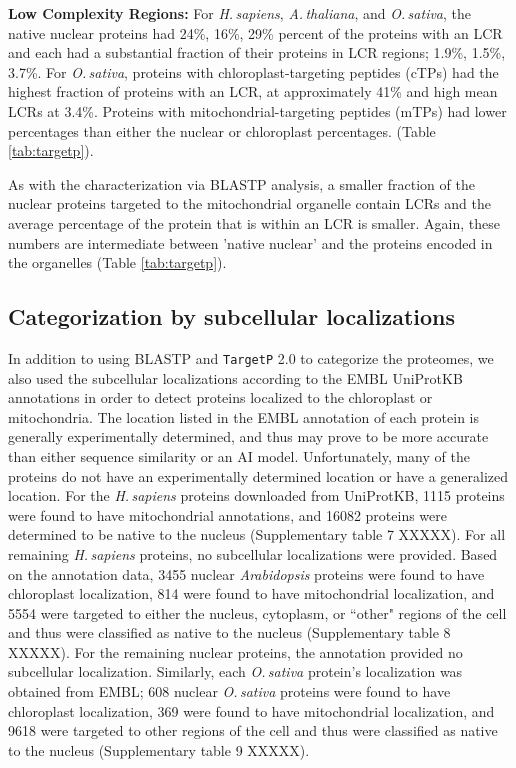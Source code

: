 \documentclass[a4paper,12pt]{article}
\newcommand{\ath}{\mbox{\textit{A.\,thaliana}}\xspace}
\newcommand{\osa}{\mbox{\textit{O.\,sativa}}\xspace}
\newcommand{\hsa}{\mbox{\textit{H.\,sapiens}}\xspace}
\newcommand{\tget}{\mbox{\texttt{TargetP}}\xspace}
\newcommand{\missing}{{\color{red}XXXXX}\xspace}
\newcommand{\humanNucNumberGenbnk}{16082\xspace}
\newcommand{\humanNucMitoNoGenbnk}{1115\xspace}
\newcommand{\arabNucNumberGenbnk}{5554\xspace}
\newcommand{\arabNucMitoNoGenbnk}{814\xspace}
\newcommand{\arabNucChloNoGenbnk}{3455\xspace}
\newcommand{\oryzNucNumberGenbnk}{9618\xspace}
\newcommand{\oryzNucMitoNoGenbnk}{369\xspace}
\newcommand{\oryzNucChloNoGenbnk}{608\xspace}
\begin{document}
\begin{multicols}{2}
\textbf{Low Complexity Regions:}
For \hsa, \ath, and \osa, the native nuclear proteins had 24\%, 16\%, 29\%
percent of the proteins with an LCR and each had a substantial fraction of
their proteins in LCR regions; 1.9\%, 1.5\%, 3.7\%.  For \osa, proteins
with chloroplast-targeting peptides (cTPs) had the highest fraction
of proteins with an LCR, at approximately 41\% and high mean LCRs at
3.4\%. Proteins with mitochondrial-targeting peptides (mTPs) had lower
percentages than either the nuclear or chloroplast percentages. (Table
\ref{tab:targetp}).

As with the characterization via BLASTP analysis, a smaller fraction
of the nuclear proteins targeted to the mitochondrial organelle contain
LCRs and the average percentage of the protein that is within an LCR is
smaller.  Again, these numbers are intermediate between 'native nuclear'
and the proteins encoded in the organelles (Table \ref{tab:targetp}).

 
\subsection*{Categorization by subcellular localizations}

In addition to using BLASTP and \tget 2.0 to categorize the proteomes, we
also used the subcellular localizations according to the EMBL UniProtKB
annotations in order to detect proteins localized to the chloroplast or
mitochondria.  The location listed in the EMBL annotation of each protein
is generally experimentally determined, and thus may prove to be more
accurate than either sequence similarity or an AI model. Unfortunately,
many of the proteins do not have an experimentally determined location
or have a generalized location. For the \hsa proteins downloaded from
UniProtKB, \humanNucMitoNoGenbnk proteins were found to have mitochondrial
annotations, and \humanNucNumberGenbnk proteins were determined to be
native to the nucleus (Supplementary table 7 \missing). For all remaining
\hsa proteins, no subcellular localizations were provided.  Based on
the annotation data, \arabNucChloNoGenbnk nuclear \textit{Arabidopsis}
proteins were found to have chloroplast localization, \arabNucMitoNoGenbnk
were found to have mitochondrial localization, and \arabNucNumberGenbnk
were targeted to either the nucleus, cytoplasm, or ``other" regions of
the cell and thus were classified as native to the nucleus (Supplementary
table 8 \missing). For the remaining nuclear proteins, the
annotation provided no subcellular localization.  Similarly, each \osa
protein's localization was obtained from EMBL; \oryzNucChloNoGenbnk
nuclear \osa proteins were found to have chloroplast localization,
\oryzNucMitoNoGenbnk were found to have mitochondrial localization, and
\oryzNucNumberGenbnk were targeted to other regions of the cell and thus
were classified as native to the nucleus (Supplementary table 9 \missing).


\end{multicols}
\end{document}

